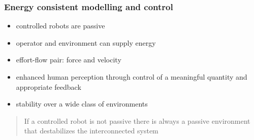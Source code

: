 \documentclass[student]{ITRslides}
\begin{document}
\begin{frame}
	\frametitle{Energy consistent modelling and control}
	\begin{itemize}
		\item controlled robots are passive
		\item operator and environment can supply energy
		\item effort-flow pair: force and velocity
		\end{itemize}
\begin{itemize}%
  \renewcommand{\labelitemi}{$\Rightarrow$}
\item enhanced human perception through control of a meaningful quantity and appropriate feedback
\item stability over a wide class of environments
			\end{itemize}
		\begin{quote}
		If a controlled robot is not passive there is always a passive environment that destabilizes the interconnected system \cite{Stramigioli_15}
		\end{quote}


\end{frame}
\end{document}
